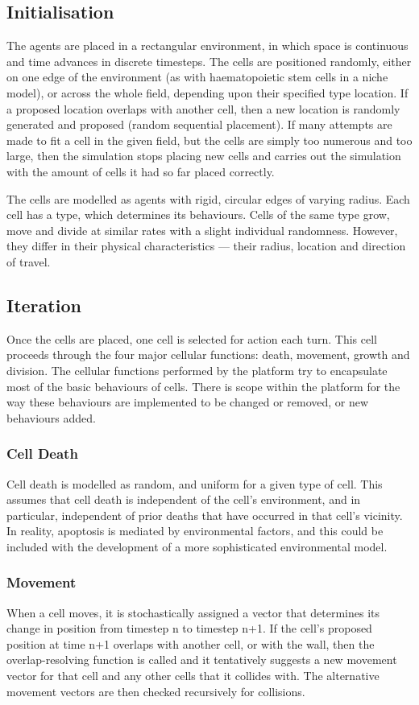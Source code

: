 \documentclass[12pt]{article}
\begin{document}
\subsection{Initialisation}
The agents are placed in a rectangular environment, in which space is 
continuous and time advances in discrete timesteps. The cells are 
positioned randomly, either on one edge of the environment (as with 
haematopoietic stem cells in a niche model), or across the whole field, 
depending upon their specified type location. If a proposed location 
overlaps with another cell, then a new location is randomly generated 
and proposed (random sequential placement). If many attempts are made to 
fit a cell in the given field, but the cells are simply too numerous and 
too large, then the simulation stops placing new cells and carries out 
the simulation with the amount of cells it had so far placed correctly.

The cells are modelled as agents with rigid, circular edges of varying 
radius. Each cell has a type, which determines its behaviours. Cells of 
the same type grow, move and divide at similar rates with a slight 
individual randomness. However, they differ in their physical 
characteristics --- their radius, location and direction of travel.

\subsection{Iteration}
Once the cells are placed, one cell is selected for action each turn. 
This cell proceeds through the four major cellular functions: death, 
movement, growth and division. The cellular functions performed by the 
platform try to encapsulate most of the basic behaviours of cells. There 
is scope within the platform for the way these behaviours are 
implemented to be changed or removed, or new behaviours added.

\subsubsection{Cell Death}
Cell death is modelled as random, and uniform for a given type of cell. 
This assumes that cell death is independent of the cell's environment, 
and in particular, independent of prior deaths that have occurred in 
that cell's vicinity. In reality, apoptosis is mediated by environmental 
factors, and this could be included with the development of a more 
sophisticated environmental model.

\subsubsection{Movement}
When a cell moves, it is stochastically assigned a vector that 
determines its change in position from timestep n to timestep n+1. If 
the cell's proposed position at time n+1 overlaps with another cell, or 
with the wall, then the overlap-resolving function is called and it 
tentatively suggests a new movement vector for that cell and any other 
cells that it collides with. The alternative movement vectors are then 
checked recursively for collisions.
\end{document}
